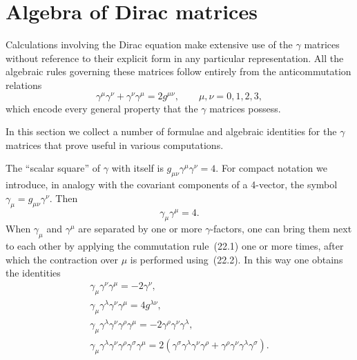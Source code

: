 \section{Algebra of Dirac matrices}

Calculations involving the Dirac equation make extensive use of the $\gamma$ matrices without reference to their explicit form in any particular representation. All the algebraic rules governing these matrices follow entirely from the anticommutation relations
\begin{equation}
\gamma^\mu\gamma^\nu + \gamma^\nu\gamma^\mu = 2g^{\mu\nu},\qquad \mu, \nu = 0, 1, 2, 3,
\tag{22.1}
\end{equation}
which encode every general property that the $\gamma$ matrices possess.

In this section we collect a number of formulae and algebraic identities for the $\gamma$ matrices that prove useful in various computations.

The ``scalar square'' of $\gamma$ with itself is $g_{\mu\nu}\gamma^\mu\gamma^\nu = 4$. For compact notation we introduce, in analogy with the covariant components of a 4-vector, the symbol $\gamma_\mu = g_{\mu\nu}\gamma^\nu$. Then
\begin{equation}
\gamma_\mu\gamma^\mu = 4.
\tag{22.2}
\end{equation}
When $\gamma_\mu$ and $\gamma^\mu$ are separated by one or more $\gamma$-factors, one can bring them next to each other by applying the commutation rule~(22.1) one or more times, after which the contraction over $\mu$ is performed using~(22.2). In this way one obtains the identities
\begin{equation}
\begin{gathered}
\gamma_\mu\gamma^\nu\gamma^\mu = -2\gamma^\nu,\\
\gamma_\mu\gamma^\lambda\gamma^\nu\gamma^\mu = 4g^{\lambda\nu},\\
\gamma_\mu\gamma^\lambda\gamma^\nu\gamma^\rho\gamma^\mu = -2\gamma^\rho\gamma^\nu\gamma^\lambda,\\
\gamma_\mu\gamma^\lambda\gamma^\nu\gamma^\rho\gamma^\sigma\gamma^\mu = 2(\gamma^\sigma\gamma^\lambda\gamma^\nu\gamma^\rho + \gamma^\rho\gamma^\nu\gamma^\lambda\gamma^\sigma).
\end{gathered}
\tag{22.3}
\end{equation}

